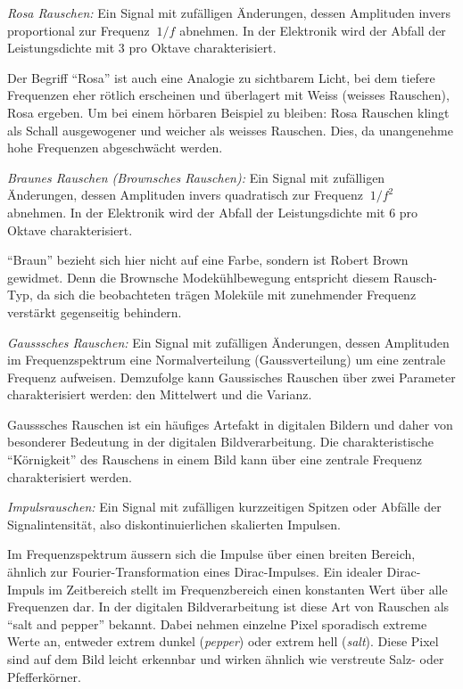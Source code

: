 \begin{definition}
	{\em Rosa Rauschen:}
	Ein Signal mit zufälligen Änderungen, dessen Amplituden invers proportional zur Frequenz $ ~1/f $  abnehmen. In der Elektronik wird der Abfall der Leistungsdichte mit 3  pro Oktave charakterisiert.
\end{definition}

 Der Begriff ``Rosa'' ist auch eine Analogie zu sichtbarem Licht, bei dem tiefere Frequenzen eher rötlich erscheinen und überlagert mit Weiss (weisses Rauschen), Rosa ergeben. Um bei einem hörbaren Beispiel zu bleiben: Rosa Rauschen klingt als Schall ausgewogener und weicher als weisses Rauschen. Dies, da unangenehme hohe Frequenzen abgeschwächt werden.

\begin{definition}
	{\em Braunes Rauschen (Brownsches Rauschen):}
	Ein Signal mit zufälligen Änderungen, dessen Amplituden invers quadratisch zur Frequenz $ ~1/f^2 $ abnehmen. In der Elektronik wird der Abfall der Leistungsdichte mit 6  pro Oktave charakterisiert.
\end{definition}

``Braun'' bezieht sich hier nicht auf eine Farbe, sondern ist Robert Brown gewidmet. Denn die Brownsche Modekühlbewegung entspricht diesem Rausch-Typ, da sich die beobachteten trägen Moleküle mit zunehmender Frequenz verstärkt gegenseitig behindern.

\begin{definition}
	{\em Gausssches Rauschen:}
	Ein Signal mit zufälligen Änderungen, dessen Amplituden im Frequenzspektrum eine Normalverteilung (Gaussverteilung) um eine zentrale Frequenz aufweisen. Demzufolge kann Gaussisches Rauschen über zwei Parameter charakterisiert werden: den Mittelwert und die Varianz.
\end{definition}

Gausssches Rauschen ist ein häufiges Artefakt in digitalen Bildern und daher von besonderer Bedeutung in der digitalen Bildverarbeitung. Die charakteristische ``Körnigkeit'' des Rauschens in einem Bild kann über eine zentrale Frequenz charakterisiert werden.

\begin{definition}
	{\em Impulsrauschen:}
	Ein Signal mit zufälligen kurzzeitigen Spitzen oder Abfälle der Signalintensität, also diskontinuierlichen skalierten Impulsen. 
\end{definition}

Im Frequenzspektrum äussern sich die Impulse über einen breiten Bereich, ähnlich zur Fourier-Transformation eines Dirac-Impulses. Ein idealer Dirac-Impuls im Zeitbereich stellt im Frequenzbereich einen konstanten Wert über alle Frequenzen dar.
In der digitalen Bildverarbeitung ist diese Art von Rauschen als ``salt and pepper'' bekannt. Dabei nehmen einzelne Pixel sporadisch extreme Werte an, entweder extrem dunkel (\textit{pepper}) oder extrem hell (\textit{salt}). Diese Pixel sind auf dem Bild leicht erkennbar und wirken ähnlich wie verstreute Salz- oder Pfefferkörner.


